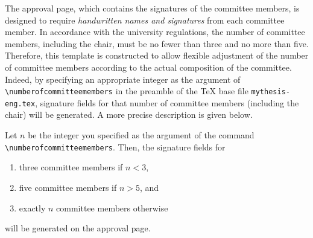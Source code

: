 The approval page, which contains the signatures of the committee members, is designed to require \emph{handwritten names and signatures} from each committee member.
In accordance with the university regulations, the number of committee members, including the chair, must be no fewer than three and no more than five.
Therefore, this template is constructed to allow flexible adjustment of the number of committee members according to the actual composition of the committee.
Indeed, by specifying an appropriate integer as the argument of \verb|\numberofcommitteemembers| in the preamble of the TeX base file \verb|mythesis-eng.tex|, signature fields for that number of committee members (including the chair) will be generated.
A more precise description is given below.
\begin{lem}
	Let $n$ be the integer you specified as the argument of the command \verb|\numberofcommitteemembers|.
	Then, the signature fields for
	\begin{enumerate}[label=(\alph*)]
		\item 	three committee members if $n < 3$,
		\item 	five committee members if $n > 5$, and
		\item 	exactly $n$ committee members otherwise
	\end{enumerate}
	will be generated on the approval page.
\end{lem}

